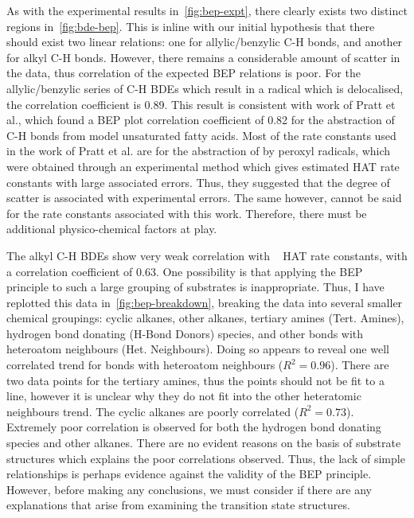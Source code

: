 As with the experimental results in~\ref{fig:bep-expt}, there clearly exists two distinct regions in~\ref{fig:bde-bep}. This is inline with our initial hypothesis that there should exist two linear relations: one for allylic/benzylic C-H bonds, and another for alkyl C-H bonds. However, there remains a considerable amount of scatter in the data, thus correlation of the expected BEP relations is poor. For the allylic/benzylic series of C-H BDEs which result in a radical which is delocalised, the correlation coefficient is 0.89. This result is consistent with work of Pratt et al.\cite{Pratt2003}, which found a BEP plot correlation coefficient of 0.82 for the abstraction of C-H bonds from model unsaturated fatty acids. Most of the rate constants used in the work of Pratt et al. are for the abstraction of  by peroxyl radicals, which were obtained through an experimental method which gives estimated HAT rate constants with large associated errors. Thus, they suggested that the degree of scatter is associated with experimental errors. The same however, cannot be said for the rate constants associated with this work. Therefore, there must be additional physico-chemical factors at play.

The alkyl C-H BDEs show very weak correlation with \cumo~ HAT rate constants, with a correlation coefficient of 0.63. One possibility is that applying the BEP principle to such a large grouping of substrates is inappropriate. Thus, I have replotted this data in~\ref{fig:bep-breakdown}, breaking the data into several smaller chemical groupings: cyclic alkanes, other alkanes, tertiary amines (Tert. Amines), hydrogen bond donating (H-Bond Donors) species, and other  bonds with heteroatom neighbours (Het. Neighbours). Doing so appears to reveal one well correlated trend for  bonds with heteroatom neighbours ($R^2 = 0.96$). There are two data points for the tertiary amines, thus the points should not be fit to a line, however it is unclear why they do not fit into the other heteratomic neighbours trend. The cyclic alkanes are poorly correlated ($R^2 = 0.73$). Extremely poor correlation is observed for both the hydrogen bond donating species and other alkanes. There are no evident reasons on the basis of substrate structures which explains the poor correlations observed. Thus, the lack of simple relationships is perhaps evidence against the validity of the BEP principle. However, before making any conclusions, we must consider if there are any explanations that arise from examining the transition state structures.

